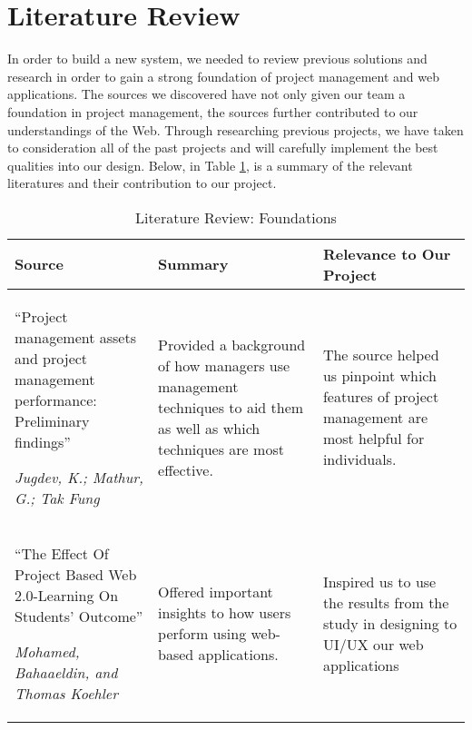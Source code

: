 \section{Literature Review}

In order to build a new system, we needed to review previous solutions and research in order to gain a strong foundation of project management and web applications. The sources we discovered have not only given our team a foundation in project management, the sources further contributed to our understandings of the Web. Through researching previous projects, we have taken to consideration all of the past projects and will carefully implement the best qualities into our design. Below, in Table \ref{FoundationLitReview}, is a summary of the relevant literatures and their contribution to our project.

\FloatBarrier
\begin{table}[ht]
\caption{Literature Review: Foundations}\label{FoundationLitReview}
\small
\begin{tabularx}{\textwidth}{|X|X|X|}
    \hline
    \textbf{Source} & \textbf{Summary} & \textbf{Relevance to Our Project}\\
    \hline
    ``Project management assets and project management performance: Preliminary findings''
     \par \textit{Jugdev, K.; Mathur, G.; Tak Fung}\cite{Jugdev} & Provided a background of how managers use management techniques to aid them as well as which techniques are most effective. & The source helped us pinpoint which features of project management are most helpful for individuals. \\
    \hline 
    ``The Effect Of Project Based Web 2.0-Learning On Students' Outcome''
	\par \textit{Mohamed, Bahaaeldin, and Thomas Koehler}\cite{Mohamed} & Offered important insights to how users perform using web-based applications. & Inspired us to use the results from the study in designing to UI/UX our web applications \\
	\hline
\end{tabularx}
\end{table}


